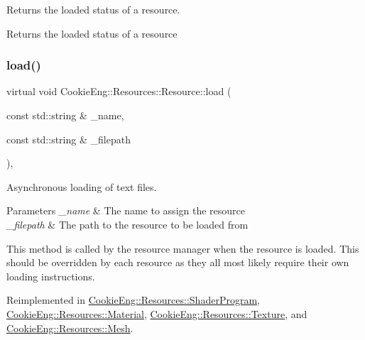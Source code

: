 Returns the loaded status of a resource. 

Returns the loaded status of a resource \mbox{\label{class_cookie_eng_1_1_resources_1_1_resource_a75648b8f2e442bebc90d6eb4ea3a2f6e}} 
\subsubsection{\texorpdfstring{load()}{load()}}
{\footnotesize\ttfamily virtual void Cookie\+Eng\+::\+Resources\+::\+Resource\+::load (\begin{DoxyParamCaption}\item[{const std\+::string \&}]{\+\_\+name,  }\item[{const std\+::string \&}]{\+\_\+filepath }\end{DoxyParamCaption})\hspace{0.3cm}{\ttfamily [inline]}, {\ttfamily [virtual]}}



Asynchronous loading of text files. 


\begin{DoxyParams}{Parameters}
{\em \+\_\+name} & The name to assign the resource \\
\hline
{\em \+\_\+filepath} & The path to the resource to be loaded from\\
\hline
\end{DoxyParams}
This method is called by the resource manager when the resource is loaded. This should be overridden by each resource as they all most likely require their own loading instructions. 

Reimplemented in \hyperlink{class_cookie_eng_1_1_resources_1_1_shader_program_aef29916bad667d1f820053fd891d9e58}{Cookie\+Eng\+::\+Resources\+::\+Shader\+Program}, \hyperlink{class_cookie_eng_1_1_resources_1_1_material_a5d14ee55b9ce265cd557b85efd0e5722}{Cookie\+Eng\+::\+Resources\+::\+Material}, \hyperlink{class_cookie_eng_1_1_resources_1_1_texture_a1f2d72c781dba6262ac5ca6e8898fc8d}{Cookie\+Eng\+::\+Resources\+::\+Texture}, and \hyperlink{struct_cookie_eng_1_1_resources_1_1_mesh_ae31053c6edaf0e735d85350bfa6093fb}{Cookie\+Eng\+::\+Resources\+::\+Mesh}.

\mbox{\label{class_cookie_eng_1_1_resources_1_1_resource_a9ad88ddeec633dbb1df1b6f1f8ff4c47}} 
